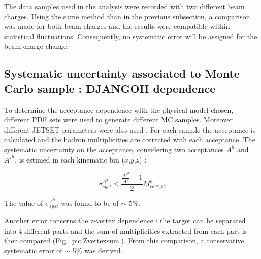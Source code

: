 The data samples used in the analysis were recorded with two different beam charges. Using the same method than in the previous subsection, a comparison was made for both beam charges and the results were compatible within statistical fluctuations. Consequently, no systematic error will be assigned for the beam charge change.


\subsection{Systematic uncertainty associated to Monte Carlo sample : DJANGOH dependence}

To determine the acceptance dependence with the physical model chosen, different PDF sets were used to generate different MC samples. Moreover different JETSET parameters were also used \cite{PDFsys}. For each sample the acceptance is calculated and the hadron multiplicities are corrected with each acceptance. The systematic uncertainty on the acceptance, considering two acceptances $A^h$ and $A'^h$, is estimed in each kinematic bin ($x$,$y$,$z$) :

\begin{equation}
  \sigma^{A^h}_{syst} \leq \frac{\frac{A'^h}{A^h}-1}{2}M^h_{corr_acc}
\end{equation}

The value of $\sigma^{A^h}_{syst}$ was found to be of $\sim$ 5\%.

Another error concerns the z-vertex dependence : the target can be separated into 4 different parts and the sum of multiplicities extracted from each part is then compared (Fig. \ref{pic:Zvertexsum}). From this comparison, a conservative systematic error of $\sim$ 5\% was derived.

